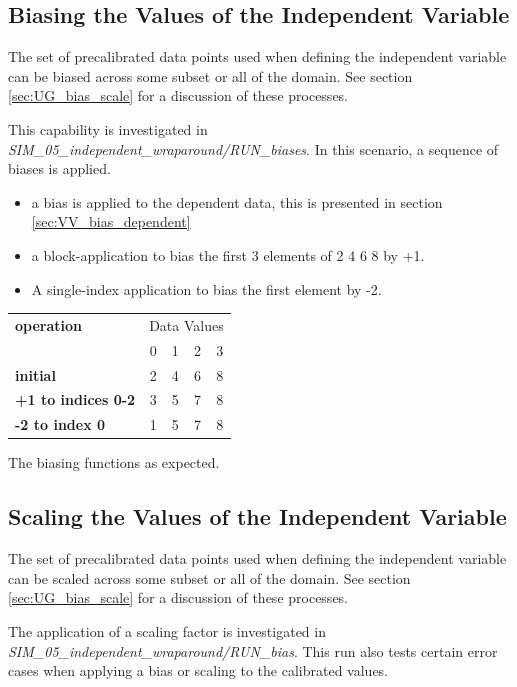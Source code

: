 \documentclass[11pt,fleqn]{report}
\begin{document}
\subsection {Biasing the Values of the Independent Variable}

The set of precalibrated data points used when defining the independent
variable can be biased across some subset or all of the domain. See section
\ref{sec:UG_bias_scale} for a discussion of these processes.

This capability is investigated in
\textit{SIM\_05\_independent\_wraparound/RUN\_biases}.
In this scenario, a sequence of biases is applied.
\begin{itemize}
\item a bias is applied to the dependent data, this is presented in section
\ref{sec:VV_bias_dependent}
\item a block-application to bias the first 3 elements of {2 4 6 8} by +1.
\item A single-index application to bias the first element by -2.
\end{itemize}

\begin{table}[ht]
\begin{center}
\begin{tabular}{||l||c|c|c|c||}
\hline \hline
\textbf{operation}& \multicolumn{4}{c||}{Data Values} \\
  & 0 & 1 & 2 & 3  \\
\hline \hline
\textbf{initial}           &2&4&6&8 \\ \hline
\textbf{+1 to indices 0-2} &3&5&7&8 \\ \hline
\textbf{-2 to index 0}     &1&5&7&8 \\
\hline \hline
\end{tabular}
\end{center}
\end{table}

The biasing functions as expected.

\subsection {Scaling the Values of the Independent Variable}
The set of precalibrated data points used when defining the independent
variable can be scaled across some subset or all of the domain.
See section \ref{sec:UG_bias_scale} for a discussion of these processes.

The application of a scaling factor is investigated in
\textit{SIM\_05\_independent\_wraparound/RUN\_bias}.  This run also tests
certain error cases when applying a bias or scaling to the calibrated
values.
\end{document}
